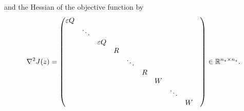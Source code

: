 \documentclass[
12pt, %
a4paper, %
onecolumn, %
portrait %
]{article}
\begin{document}
and the Hessian of the objective function by
\begin{equation}
\nabla^2 J(z) = 
\begin{pmatrix}
\varepsilon Q &        &     &   &        &   &   &        &   &                  \\
    & \ddots &     &   &        &   &   &        &   &                  \\
    &        & \varepsilon Q &   &        &   &   &        &   &                  \\
    &        &     & R &        &   &   &        &   &                  \\
    &        &     &   & \ddots &   &   &        &   &                  \\
    &        &     &   &        & R &   &        &   &                  \\
    &        &     &   &        &   & W &        &   &                  \\
    &        &     &   &        &   &   & \ddots &   &                  \\
    &        &     &   &        &   &   &        & W &                  \\
\end{pmatrix} \in \mathbb{R}^{n_z \times n_z}.
\end{equation}
\end{document}
